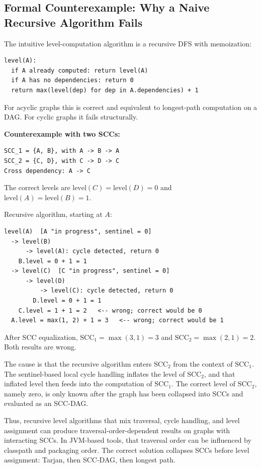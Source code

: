 \documentclass[a4paper,twoside]{article}
\begin{document}
\subsection*{Formal Counterexample: Why a Naive Recursive Algorithm Fails}

The intuitive level-computation algorithm is a recursive DFS with memoization:

\begin{verbatim}
level(A):
  if A already computed: return level(A)
  if A has no dependencies: return 0
  return max(level(dep) for dep in A.dependencies) + 1
\end{verbatim}

For acyclic graphs this is correct and equivalent to longest-path computation
on a DAG. For cyclic graphs it fails structurally.

\textbf{Counterexample with two SCCs:}

\begin{verbatim}
SCC_1 = {A, B}, with A -> B -> A
SCC_2 = {C, D}, with C -> D -> C
Cross dependency: A -> C
\end{verbatim}

The correct levels are $\text{level}(C)=\text{level}(D)=0$ and
$\text{level}(A)=\text{level}(B)=1$.

Recursive algorithm, starting at $A$:

\begin{verbatim}
level(A)  [A "in progress", sentinel = 0]
  -> level(B)
      -> level(A): cycle detected, return 0
    B.level = 0 + 1 = 1
  -> level(C)  [C "in progress", sentinel = 0]
      -> level(D)
          -> level(C): cycle detected, return 0
        D.level = 0 + 1 = 1
    C.level = 1 + 1 = 2   <-- wrong; correct would be 0
  A.level = max(1, 2) + 1 = 3   <-- wrong; correct would be 1
\end{verbatim}

After SCC equalization, $\text{SCC}_1=\max(3,1)=3$ and
$\text{SCC}_2=\max(2,1)=2$. Both results are wrong.

The cause is that the recursive algorithm enters $\text{SCC}_2$ from the
context of $\text{SCC}_1$. The sentinel-based local cycle handling inflates the
level of $\text{SCC}_2$, and that inflated level then feeds into the
computation of $\text{SCC}_1$. The correct level of $\text{SCC}_2$, namely
zero, is only known after the graph has been collapsed into SCCs and evaluated
as an SCC-DAG.

Thus, recursive level algorithms that mix traversal, cycle handling, and level
assignment can produce traversal-order-dependent results on graphs with
interacting SCCs. In JVM-based tools, that traversal order can be influenced by
classpath and packaging order. The correct solution collapses SCCs before level
assignment: Tarjan, then SCC-DAG, then longest path.
\end{document}
